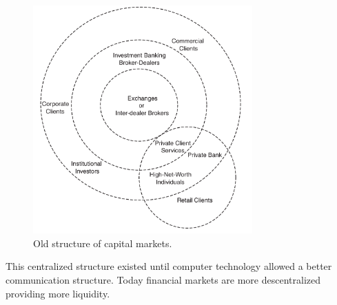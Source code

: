 \begin{figure}[!h]
  \centering
  \includegraphics[width=0.75\textwidth]{img/capitalmarkets}
  \caption{Old structure of capital markets.}
  \label{fig:capitalmarket}
\end{figure}



This centralized structure existed until computer technology allowed a better
communication structure. Today financial markets are more descentralized
providing more liquidity.




